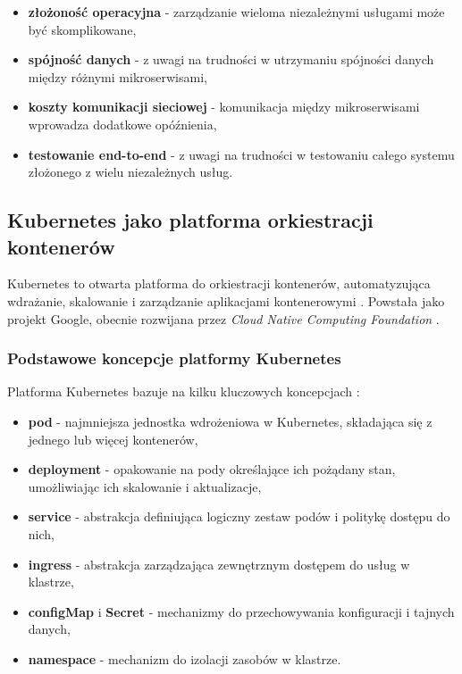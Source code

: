 \begin{itemize}
    \item \textbf{złożoność operacyjna} - zarządzanie wieloma niezależnymi usługami może być skomplikowane,
    \item \textbf{spójność danych} - z uwagi na trudności w utrzymaniu spójności danych między różnymi mikroserwisami,
    \item \textbf{koszty komunikacji sieciowej} - komunikacja między mikroserwisami wprowadza dodatkowe opóźnienia,
    \item \textbf{testowanie end-to-end} - z uwagi na trudności w testowaniu całego systemu złożonego z wielu niezależnych usług.
\end{itemize}

\subsection{Kubernetes jako platforma orkiestracji kontenerów}
\label{subsec:kubernetes}

Kubernetes to otwarta platforma do orkiestracji kontenerów, automatyzująca wdrażanie, skalowanie i zarządzanie aplikacjami
kontenerowymi \cite{kubernetes}. Powstała jako projekt Google, obecnie rozwijana przez \textit{Cloud Native Computing Foundation} \cite{cncf_website}.

\subsubsection{Podstawowe koncepcje platformy Kubernetes}
\label{subsubsec:podstawy_kubernetes}

Platforma Kubernetes bazuje na kilku kluczowych koncepcjach \cite{kubernetes_concepts}:

\begin{itemize}
    \item \textbf{pod} - najmniejsza jednostka wdrożeniowa w Kubernetes, składająca się z jednego lub więcej kontenerów,
    \item \textbf{deployment} - opakowanie na pody określające ich pożądany stan, umożliwiając ich skalowanie i aktualizacje,
    \item \textbf{service} - abstrakcja definiująca logiczny zestaw podów i politykę dostępu do nich,
    \item \textbf{ingress} - abstrakcja zarządzająca zewnętrznym dostępem do usług w klastrze,
    \item \textbf{configMap} i \textbf{Secret} - mechanizmy do przechowywania konfiguracji i tajnych danych,
    \item \textbf{namespace} - mechanizm do izolacji zasobów w klastrze.
\end{itemize}

